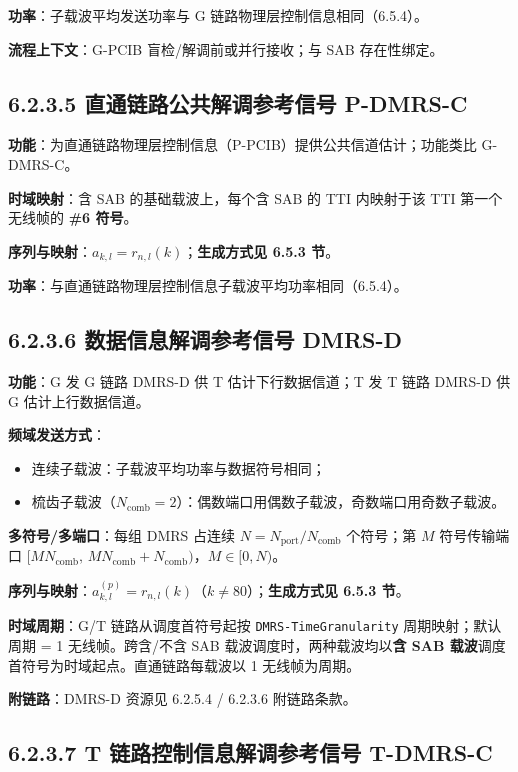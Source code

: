 \documentclass[11pt,a4paper]{ctexart}
\begin{document}
\textbf{功率}：子载波平均发送功率与 G 链路物理层控制信息相同（6.5.4）。

\textbf{流程上下文}：G-PCIB 盲检/解调前或并行接收；与 SAB 存在性绑定。

\subsection{6.2.3.5 直通链路公共解调参考信号 P-DMRS-C}

\textbf{功能}：为直通链路物理层控制信息（P-PCIB）提供公共信道估计；功能类比 G-DMRS-C。

\textbf{时域映射}：含 SAB 的基础载波上，每个含 SAB 的 TTI 内映射于该 TTI 第一个无线帧的 \textbf{\#6 符号}。

\textbf{序列与映射}：$a_{k,l}=r_{n,l}(k)$；\textbf{生成方式见 6.5.3 节}。

\textbf{功率}：与直通链路物理层控制信息子载波平均功率相同（6.5.4）。

\subsection{6.2.3.6 数据信息解调参考信号 DMRS-D}

\textbf{功能}：G 发 G 链路 DMRS-D 供 T 估计下行数据信道；T 发 T 链路 DMRS-D 供 G 估计上行数据信道。

\textbf{频域发送方式}：
\begin{itemize}[nosep]
  \item 连续子载波：子载波平均功率与数据符号相同；
  \item 梳齿子载波（$N_{\mathrm{comb}}{=}2$）：偶数端口用偶数子载波，奇数端口用奇数子载波。
\end{itemize}

\textbf{多符号/多端口}：每组 DMRS 占连续 $N=N_{\mathrm{port}}/N_{\mathrm{comb}}$ 个符号；第 $M$ 符号传输端口 $[M N_{\mathrm{comb}},\, M N_{\mathrm{comb}}+N_{\mathrm{comb}})$，$M{\in}[0,N)$。

\textbf{序列与映射}：$a_{k,l}^{(p)}=r_{n,l}(k)$（$k{\neq}80$）；\textbf{生成方式见 6.5.3 节}。

\textbf{时域周期}：G/T 链路从调度首符号起按 \texttt{DMRS-TimeGranularity} 周期映射；默认周期 = 1 无线帧。跨含/不含 SAB 载波调度时，两种载波均以\textbf{含 SAB 载波}调度首符号为时域起点。直通链路每载波以 1 无线帧为周期。

\textbf{附链路}：DMRS-D 资源见 6.2.5.4 / 6.2.3.6 附链路条款。

\subsection{6.2.3.7 T 链路控制信息解调参考信号 T-DMRS-C}
\end{document}
